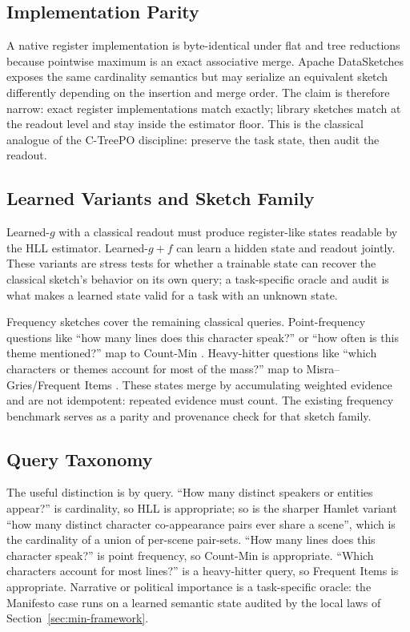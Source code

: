 \subsection{Implementation Parity}

A native register implementation is byte-identical under flat and tree
reductions because pointwise maximum is an exact associative merge. Apache
DataSketches exposes the same cardinality semantics but may serialize an
equivalent sketch differently depending on the insertion and merge order.
The claim is therefore narrow: exact register implementations match
exactly; library sketches match at the readout level and stay inside the
estimator floor. This is the classical analogue of the C-TreePO
discipline: preserve the task state, then audit the readout.

\subsection{Learned Variants and Sketch Family}

Learned-\(g\) with a classical readout must produce register-like states
readable by the HLL estimator. Learned-\(g{+}f\) can learn a hidden state
and readout jointly. These variants are stress tests for whether a
trainable state can recover the classical sketch's behavior on its own
query; a task-specific oracle and audit is what makes a learned state
valid for a task with an unknown state.

Frequency sketches cover the remaining classical queries. Point-frequency
questions like ``how many lines does this character speak?'' or ``how often
is this theme mentioned?'' map to Count-Min
\citep{CormodeMuthukrishnan2005}. Heavy-hitter questions like ``which
characters or themes account for most of the mass?'' map to
Misra--Gries/Frequent Items
\citep{MisraGries1982,MetwallyAgrawalAbbadi2006}. These states merge by
accumulating weighted evidence and are not idempotent: repeated evidence
must count. The existing frequency benchmark serves as a parity and
provenance check for that sketch family.

\subsection{Query Taxonomy}

The useful distinction is by query. ``How many distinct speakers or
entities appear?'' is cardinality, so HLL is appropriate; so is the
sharper Hamlet variant ``how many distinct character co-appearance pairs
ever share a scene'', which is the cardinality of a union of per-scene
pair-sets. ``How many lines does this character speak?'' is point
frequency, so Count-Min is appropriate. ``Which characters account for
most lines?'' is a heavy-hitter query, so Frequent Items is appropriate.
Narrative or political importance is a task-specific oracle: the Manifesto
case runs on a learned semantic state audited by the local laws of
Section~\ref{sec:min-framework}.
